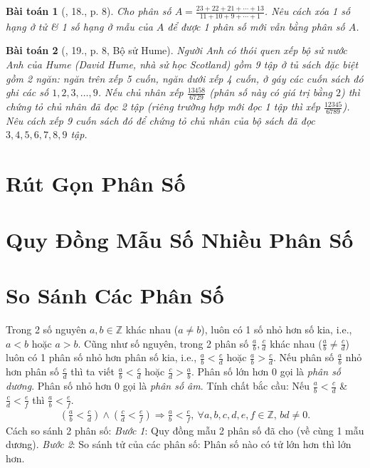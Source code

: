 \documentclass{article}
\newtheorem{baitoan}{Bài toán}
\begin{document}
\begin{baitoan}[\cite{Binh_Toan_6_tap_2}, 18., p. 8]
	Cho phân số $A = \frac{23 + 22 + 21 + \cdots + 13}{11 + 10 + 9 + \cdots + 1}$. Nêu cách xóa 1 số hạng ở tử \& 1 số hạng ở mẫu của $A$ để được 1 phân số mới vẫn bằng phân số $A$.
\end{baitoan}

\begin{baitoan}[\cite{Binh_Toan_6_tap_2}, 19., p. 8, Bộ sử Hume]
	Người Anh có thói quen xếp bộ sử nước Anh của Hume (David Hume, nhà sử học Scotland) gồm 9 tập ở tủ sách đặc biệt gồm 2 ngăn: ngăn trên xếp 5 cuốn, ngăn dưới xếp 4 cuốn, ở gáy các cuốn sách đó ghi các số $1,2,3,\ldots,9$. Nếu chủ nhân xếp $\frac{13458}{6729}$ (phân số này có giá trị bằng $2$) thì chứng tỏ chủ nhân đã đọc 2 tập (riêng trường hợp mới đọc 1 tập thì xếp $\frac{12345}{6789}$). Nêu cách xếp 9 cuốn sách đó để chứng tỏ chủ nhân của bộ sách đã đọc $3,4,5,6,7,8,9$ tập.
\end{baitoan}


\section{Rút Gọn Phân Số}


\section{Quy Đồng Mẫu Số Nhiều Phân Số}


\section{So Sánh Các Phân Số}
Trong 2 số nguyên $a,b\in\mathbb{Z}$ khác nhau ($a\ne b$), luôn có 1 số nhỏ hơn số kia, i.e., $a < b$ hoặc $a > b$. Cũng như số nguyên, trong 2 phân số $\frac{a}{b},\frac{c}{d}$ khác nhau ($\frac{a}{b}\ne\frac{c}{d}$) luôn có 1 phân số nhỏ hơn phân số kia, i.e., $\frac{a}{b} < \frac{c}{d}$ hoặc $\frac{a}{b} > \frac{c}{d}$. Nếu phân số $\frac{a}{b}$ nhỏ hơn phân số $\frac{c}{d}$ thì ta viết $\frac{a}{b} < \frac{c}{d}$ hoặc $\frac{c}{d} > \frac{a}{b}$. Phân số lớn hơn $0$ gọi là \textit{phân số dương}. Phân số nhỏ hơn $0$ gọi là \textit{phân số âm}. Tính chất bắc cầu: Nếu $\frac{a}{b} < \frac{c}{d}$ \& $\frac{c}{d} < \frac{e}{f}$ thì $\frac{a}{b} < \frac{e}{f}$.
\begin{align*}
	\left(\frac{a}{b} < \frac{c}{d}\right)\land\left(\frac{c}{d} < \frac{e}{f}\right)\Rightarrow\frac{a}{b} < \frac{e}{f},\ \forall a,b,c,d,e,f\in\mathbb{Z},\,bd\ne0.
\end{align*}
Cách so sánh 2 phân số: \textit{Bước 1}: Quy đồng mẫu 2 phân số đã cho (về cùng 1 mẫu dương). \textit{Bước 2}: So sánh tử của các phân số: Phân số nào có tử lớn hơn thì lớn hơn.
\end{document}
